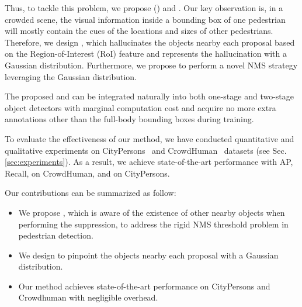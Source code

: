 \documentclass[sigconf]{acmart}
\begin{document}
Thus, to tackle this problem, we propose \heatmapname{} (\heatmapnameshort{}) and \nmsname{}. Our key observation is, in a crowded scene, the visual information inside a bounding box of one pedestrian will mostly contain the cues of the locations and sizes of other pedestrians. Therefore, we design \heatmapnameshort{}, which hallucinates the objects nearby each proposal based on the Region-of-Interest (RoI) feature and represents the hallucination with a Gaussian distribution. Furthermore, we propose \nmsname{} to perform a novel NMS strategy leveraging the Gaussian distribution.

The proposed \heatmapnameshort{} and \nmsname{} can be integrated naturally into both one-stage and two-stage object detectors with marginal computation cost and acquire no more extra annotations other than the full-body bounding boxes during training.

To evaluate the effectiveness of our method, we have conducted quantitative and qualitative experiments on CityPersons~\cite{citypersons} and CrowdHuman~\cite{crowdhuman} datasets (see Sec. \ref{sec:experiments}). As a result, we achieve state-of-the-art performance with  AP,  Recall,  \mr{} on CrowdHuman, and  \mr{} on CityPersons.

Our contributions can be summarized as follow:
\begin{itemize}
  \item We propose \nmsname{}, which is aware of the existence of other nearby objects when performing the suppression, to address the rigid NMS threshold problem in pedestrian detection.
  \item We design \heatmapnameshort{} to pinpoint the objects nearby each proposal with a Gaussian distribution.
  \item Our method achieves state-of-the-art performance on CityPersons and Crowdhuman with negligible overhead.
\end{itemize}
\end{document}
